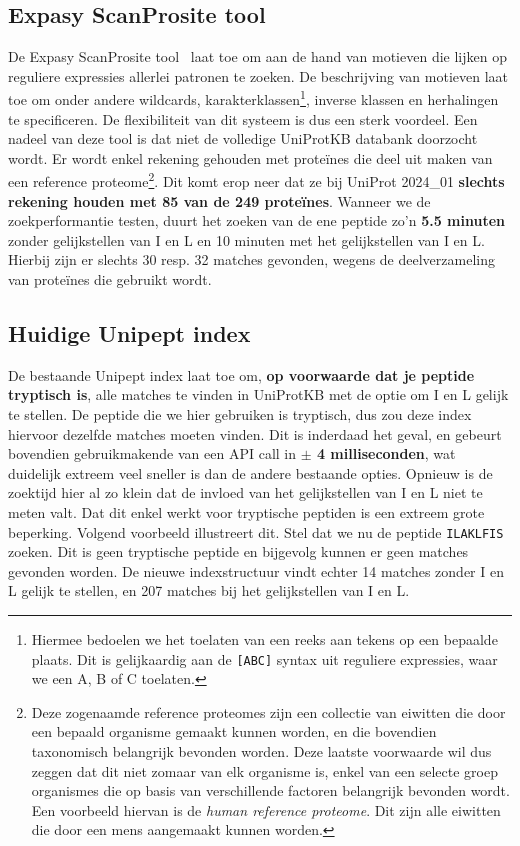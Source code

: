 \subsection{Expasy ScanProsite tool}
De Expasy ScanProsite tool~\cite{scanprosite} laat toe om aan de hand van motieven die lijken op reguliere expressies allerlei patronen te zoeken.
De beschrijving van motieven laat toe om onder andere wildcards, karakterklassen\footnote{Hiermee bedoelen we het toelaten van een reeks aan tekens op een bepaalde plaats. Dit is gelijkaardig aan de \texttt{[ABC]} syntax uit reguliere expressies, waar we een A, B of C toelaten.}, inverse klassen en herhalingen te specificeren.
De flexibiliteit van dit systeem is dus een sterk voordeel.
Een nadeel van deze tool is dat niet de volledige UniProtKB databank doorzocht wordt.
Er wordt enkel rekening gehouden met proteïnes die deel uit maken van een reference proteome\footnote{Deze zogenaamde reference proteomes zijn een collectie van eiwitten die door een bepaald organisme gemaakt kunnen worden, en die bovendien taxonomisch belangrijk bevonden worden. Deze laatste voorwaarde wil dus zeggen dat dit niet zomaar van elk organisme is, enkel van een selecte groep organismes die op basis van verschillende factoren belangrijk bevonden wordt. Een voorbeeld hiervan is de \textit{human reference proteome}. Dit zijn alle eiwitten die door een mens aangemaakt kunnen worden.}.
Dit komt erop neer dat ze bij UniProt 2024\_01 \textbf{slechts rekening houden met 85 van de 249 proteïnes}.
Wanneer we de zoekperformantie testen, duurt het zoeken van de ene peptide zo'n \textbf{5.5 minuten} zonder gelijkstellen van I en L en 10 minuten met het gelijkstellen van I en L\@.
Hierbij zijn er slechts 30 resp. 32 matches gevonden, wegens de deelverzameling van proteïnes die gebruikt wordt.

\subsection{Huidige Unipept index}
De bestaande Unipept index laat toe om, \textbf{op voorwaarde dat je peptide tryptisch is}, alle matches te vinden in UniProtKB met de optie om I en L gelijk te stellen.
De peptide die we hier gebruiken is tryptisch, dus zou deze index hiervoor dezelfde matches moeten vinden.
Dit is inderdaad het geval, en gebeurt bovendien gebruikmakende van een API call in \textbf{$\pm$ 4 milliseconden}, wat duidelijk extreem veel sneller is dan de andere bestaande opties.
Opnieuw is de zoektijd hier al zo klein dat de invloed van het gelijkstellen van I en L niet te meten valt.
Dat dit enkel werkt voor tryptische peptiden is een extreem grote beperking.
Volgend voorbeeld illustreert dit.
Stel dat we nu de peptide \texttt{ILAKLFIS} zoeken.
Dit is geen tryptische peptide en bijgevolg kunnen er geen matches gevonden worden.
De nieuwe indexstructuur vindt echter 14 matches zonder I en L gelijk te stellen, en 207 matches bij het gelijkstellen van I en L\@.

